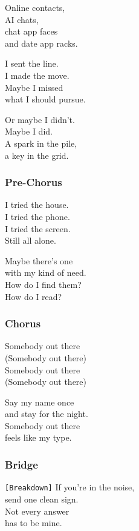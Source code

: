 Online contacts,\\
AI chats,\\
chat app faces\\
and date app racks.

I sent the line.\\
I made the move.\\
Maybe I missed\\
what I should pursue.

Or maybe I didn't.\\
Maybe I did.\\
A spark in the pile,\\
a key in the grid.

\subsubsection{Pre-Chorus}\label{pre-chorus-7}

I tried the house.\\
I tried the phone.\\
I tried the screen.\\
Still all alone.

Maybe there's one\\
with my kind of need.\\
How do I find them?\\
How do I read?

\subsubsection{Chorus}\label{chorus-15}

Somebody out there\\
(Somebody out there)\\
Somebody out there\\
(Somebody out there)

Say my name once\\
and stay for the night.\\
Somebody out there\\
feels like my type.

\subsubsection{Bridge}\label{bridge-5}

\texttt{{[}Breakdown{]}} If you're in the noise,\\
send one clean sign.\\
Not every answer\\
has to be mine.

